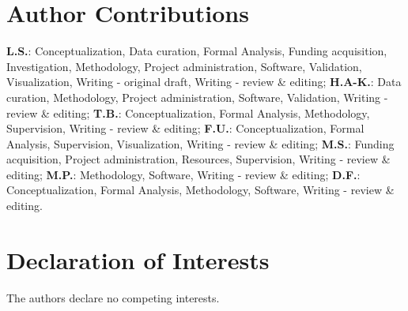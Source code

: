 \documentclass[5p,numafflabel]{elsarticle}
\begin{document}
\section*{Author Contributions}


\textbf{L.S.}:
Conceptualization,
Data curation,
Formal Analysis,
Funding acquisition,
Investigation,
Methodology,
Project administration,
Software,
Validation,
Visualization,
Writing - original draft,
Writing - review \& editing;
\textbf{H.A-K.}:
Data curation,
Methodology,
Project administration,
Software,
Validation,
Writing - review \& editing;
\textbf{T.B.}:
Conceptualization,
Formal Analysis,
Methodology,
Supervision,
Writing - review \& editing;
\textbf{F.U.}:
Conceptualization,
Formal Analysis,
Supervision,
Visualization,
Writing - review \& editing;
\textbf{M.S.}:
Funding acquisition,
Project administration,
Resources,
Supervision,
Writing - review \& editing;
\textbf{M.P.}:
Methodology,
Software,
Writing - review \& editing;
\textbf{D.F.}:
Conceptualization,
Formal Analysis,
Methodology,
Software,
Writing - review \& editing.


\section*{Declaration of Interests}

The authors declare no competing interests.
\end{document}
